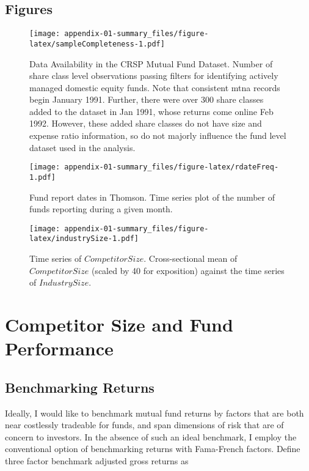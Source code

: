 \documentclass[openany]{book}
\theoremstyle{definition}
\theoremstyle{definition}
\theoremstyle{definition}
\theoremstyle{remark}
\begin{document}
\section{Figures}\label{figures}

\begin{figure}
\centering
\texttt{[image: appendix-01-summary\_files/figure-latex/sampleCompleteness-1.pdf]}
\caption{\label{fig:sampleCompleteness}Data Availability in the CRSP Mutual
Fund Dataset. Number of share class level observations passing filters
for identifying actively managed domestic equity funds. Note that
consistent mtna records begin January 1991. Further, there were over 300
share classes added to the dataset in Jan 1991, whose returns come
online Feb 1992. However, these added share classes do not have size and
expense ratio information, so do not majorly influence the fund level
dataset used in the analysis.}
\end{figure}

\begin{figure}
\centering
\texttt{[image: appendix-01-summary\_files/figure-latex/rdateFreq-1.pdf]}
\caption{\label{fig:rdateFreq}Fund report dates in Thomson. Time series plot
of the number of funds reporting during a given month.}
\end{figure}

\begin{figure}
\centering
\texttt{[image: appendix-01-summary\_files/figure-latex/industrySize-1.pdf]}
\caption{\label{fig:industrySize}Time series of \(CompetitorSize\).
Cross-sectional mean of \(CompetitorSize\) (scaled by 40 for exposition)
against the time series of \(IndustrySize\).}
\end{figure}

\chapter{Competitor Size and Fund
Performance}\label{sec:CSandPerformance}

\section{Benchmarking Returns}\label{sec:benchmark}

Ideally, I would like to benchmark mutual fund returns by factors that
are both near costlessly tradeable for funds, and span dimensions of
risk that are of concern to investors. In the absence of such an ideal
benchmark, I employ the conventional option of benchmarking returns with
Fama-French factors. Define three factor benchmark adjusted gross
returns as
\end{document}
